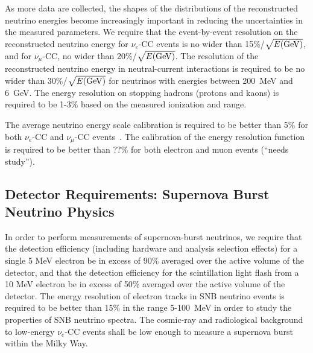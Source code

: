 As more data are collected, the shapes of the distributions of the
reconstructed neutrino energies become increasingly important in
reducing the uncertainties in the measured parameters.  We require
that the event-by-event resolution on the reconstructed neutrino
energy for $\nu_e$-CC events is no wider than 15\%/$\sqrt{E({\rm GeV})}$,
 and for $\nu_\mu$-CC, no wider than 20\%/$\sqrt{E({\rm GeV})}$.  
The resolution of the reconstructed neutrino energy in
neutral-current interactions is required to be no wider than
30\%/$\sqrt{E({\rm GeV})}$ for neutrinos with energies between 200~MeV
and 6~GeV.  The energy resolution on stopping hadrons (protons and kaons) is required
to be 1-3\% based on the measured ionization and range.

The average neutrino energy scale calibration is required
to be better than 5\% for both $\nu_e$-CC and $\nu_\mu$-CC
events~\cite{docdb8741}.  %
The calibration of the energy resolution function is required to be better than ??\%
for both electron and muon events (``needs study'').

\subsection{Detector Requirements: Supernova Burst Neutrino Physics}

In order to perform measurements of supernova-burst neutrinos, we
require that the detection efficiency (including hardware and analysis
selection effects) for a single 5 MeV electron be in excess of 90\%
averaged over the active volume of the detector, and that the
detection efficiency for the scintillation light flash from a 10 MeV
electron be in excess of 50\% averaged over the active volume of the
detector.  The energy resolution of electron tracks in SNB neutrino
events is required to be better than 15\% in the range 5-100~MeV in
order to study the properties of SNB neutrino spectra.  The cosmic-ray
and radiological background to low-energy $\nu_e$-CC events shall be low enough to measure
a supernova burst within the Milky Way.

